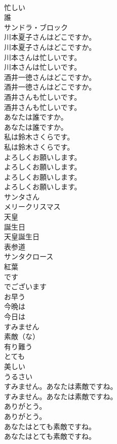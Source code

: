 \documentclass[8pt]{extreport}
\begin{document}
\begin{CJK}{UTF8}{min}
\\	忙しい
\\	誰
\\	サンドラ・ブロック
\\	川本夏子さんはどこですか。	
\\	川本夏子さんはどこですか。 
\\	川本さんは忙しいです。	
\\	川本さんは忙しいです。 
\\	酒井一徳さんはどこですか。	
\\	酒井一徳さんはどこですか。 
\\	酒井さんも忙しいです。	
\\	酒井さんも忙しいです。 
\\	あなたは誰ですか。	
\\	あなたは誰ですか。 
\\	私は鈴木さくらです。	
\\	私は鈴木さくらです。 
\\	よろしくお願いします。	
\\	よろしくお願いします。 
\\	よろしくお願いします。	
\\	よろしくお願いします。 
\\	サンタさん
\\	メリークリスマス
\\	天皇
\\	誕生日
\\	天皇誕生日
\\	表参道
\\	サンタクロース
\\	紅葉
\\	です
\\	でございます
\\	お早う
\\	今晩は
\\	今日は
\\	すみません
\\	素敵（な）
\\	有り難う
\\	とても
\\	美しい
\\	うるさい
\\	すみません。あなたは素敵ですね。	
\\	すみません。あなたは素敵ですね。 
\\	ありがとう。	
\\	ありがとう。 
\\	あなたはとても素敵ですね。	
\\	あなたはとても素敵ですね。 

\end{CJK}
\end{document}
